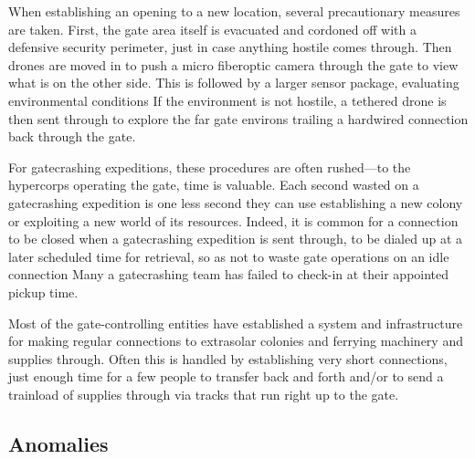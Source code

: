 When establishing an opening to a new location, several precautionary measures are taken. First, the gate area itself is evacuated and cordoned off with a defensive security perimeter, just in case anything hostile comes through. Then drones are moved in to push a micro fiberoptic camera through the gate to view what is on the other side. This is followed by a larger sensor package, evaluating environmental conditions If the environment is not hostile, a tethered drone is then sent through to explore the far gate environs trailing a hardwired connection back through the gate. 

For gatecrashing expeditions, these procedures are often rushed—to the hypercorps operating the gate, time is valuable. Each second wasted on a gatecrashing expedition is one less second they can use establishing a new colony or exploiting a new world of its resources. Indeed, it is common for a connection to be closed when a gatecrashing expedition is sent through, to be dialed up at a later scheduled time for retrieval, so as not to waste gate operations on an idle connection Many a gatecrashing team has failed to check-in at their appointed pickup time. 

Most of the gate-controlling entities have established a system and infrastructure for making regular connections to extrasolar colonies and ferrying machinery and supplies through. Often this is handled by establishing very short connections, just enough time for a few people to transfer back and forth and/or to send a trainload of supplies through via tracks that run right up to the gate. 

\subsection{Anomalies} 

